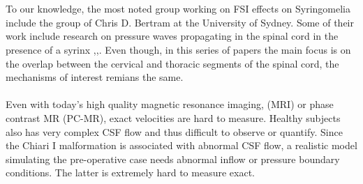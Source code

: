 \\
\\
To our knowledge, the most noted group working on FSI effects on Syringomelia include the group of Chris D. Bertram at the University of Sydney. Some of their work include research on pressure waves propagating in the spinal cord in the presence of a syrinx \cite{Bert05},\cite{Bert08},\cite{Bert09}. Even though, in this series of papers the main focus is on the overlap between the cervical and thoracic segments of the spinal cord, the mechanisms of interest remians the same.
\\
\\
Even with today's high quality magnetic resonance imaging, (MRI) or phase contrast MR (PC-MR), exact velocities are hard to measure. Healthy subjects also has very complex CSF flow and thus difficult to observe or quantify. Since the Chiari I malformation is associated with abnormal CSF flow, a realistic model simulating the pre-operative case needs abnormal inflow or pressure boundary conditions. The latter is extremely hard to measure exact. 


